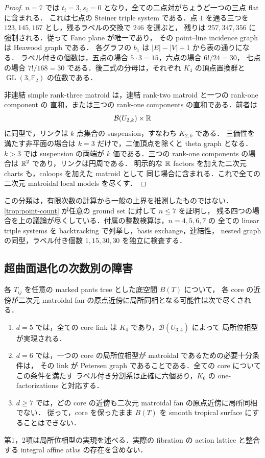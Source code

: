 \begin{proof}
$n=7$ では $t_i=3,s_i=0$ となり，全ての二点対がちょうど一つの三点 flat に含まれる．
これは七点の Steiner triple system である．点 $1$ を通る三つを
$123,145,167$ とし，残るラベルの交換で $246$ を選ぶと，
残りは $257,347,356$ に強制される．従って Fano plane が唯一であり，
その point--line incidence graph は Heawood graph である．
各グラフの $b_1$ は $|E|-|V|+1$ から表の通りになる．
ラベル付きの個数は，五点の場合 $5\cdot3=15$，六点の場合 $6!/24=30$，
七点の場合 $7!/168=30$ である．後二式の分母は，それぞれ $K_4$ の頂点置換群と
$\operatorname{GL}(3,\mathbb F_2)$ の位数である．

非連結 simple rank-three matroid は，連結 rank-two matroid と一つの rank-one component の
直和，または三つの rank-one components の直和である．前者は
\[
 \mathcal B(U_{2,k})\times\mathbb R
\]
に同型で，リンクは $k$ 点集合の suspension，すなわち $K_{2,k}$ である．
三価性を満たす非平面の場合は $k=3$ だけで，二価頂点を除くと theta graph となる．
$k>3$ では suspension の両端が $k$ 価である．三つの rank-one components の場合は
$\mathbb R^2$ であり，リンクは円周である．
明示的な $\mathbb R$ factors を加えた二次元 charts も，coloops を加えた matroid として
同じ場合に含まれる．これで全ての二次元 matroidal local models を尽くす．
\end{proof}

\begin{remark}\label{trop:verification}
この分類は，有限次数の計算から一般の上界を推測したものではない．
\eqref{trop:point-count} が任意の ground set に対して $n\leq7$ を証明し，
残る四つの場合を上の議論が尽くしている．付属の整数検算は，$n=4,5,6,7$ の
全ての linear triple systems を backtracking で列挙し，basis exchange，連結性，
nested graph の同型，ラベル付き個数 $1,15,30,30$ を独立に検査する．
\end{remark}

\subsection{超曲面退化の次数別の障害}

\begin{theorem}
\label{trop:degree-classification}
各 $T_{ij}$ を任意の marked pants tree とした底空間 $B(T)$ について，
各 core の近傍が二次元 matroidal fan の原点近傍に局所同相となる可能性は次で尽くされる．
\begin{enumerate}
\item $d=5$ では，全ての core link は $K_4$ であり，$\mathcal B(U_{3,4})$ によって
  局所位相型が実現される．
\item $d=6$ では，一つの core の局所位相型が matroidal であるための必要十分条件は，
  その link が Petersen graph であることである．全ての core についてこの条件を満たす
  ラベル付き分割系は正確に六個あり，$K_6$ の one-factorizations と対応する．
\item $d\geq7$ では，どの core の近傍も二次元 matroidal fan の原点近傍に局所同相でない．
  従って，core を保ったまま $B(T)$ を smooth tropical surface にすることはできない．
\end{enumerate}
第1，2項は局所位相型の実現を述べる．実際の fibration の action lattice と整合する
integral affine atlas の存在を含めない．
\end{theorem}

